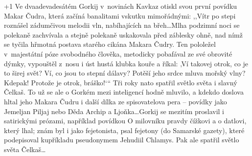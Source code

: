 \looseness+1
Ve dvaadevadesátém Gorkij v novinách Kavkaz otiskl svou první povídku Makar Čudra, která začíná banalitami vskutku mimořádnými: ,,Vítr po stepi roznášel zádumčivou melodii vln, nabíhajících na břeh\ldots Mlha podzimní noci se polekaně zachvívala a stejně polekaně uskakovala před záblesky ohně, nad nímž se tyčila hřmotná postava starého cikána Makara Čudry. Ten pololežel v majestátní póze svobodného člověka, metodicky pobafával ze své obrovité dýmky, vypouštěl z nosu i úst hustá klubka kouře a říkal: ‚Ví takovej otrok, co je to širej svět? Ví, co jsou to stepní dálavy? Potěší jeho srdce mluva mořský vlny? Kdepak! Protože je otrok, bráško!‘`` Tři roky nato spatřil světlo světa i slavný Čelkaš. To už se ale o Gorkém mezi inteligencí hodně mluvilo, a kdekdo doslova hltal jeho Makara Čudru i další dílka ze spisovatelova pera -- povídky jako Jemeljan Piljaj nebo Děda Archip a Ljoňka\ldots Gorkij se mezitím proslavil i satirickými prózami, například povídkou O milovníku pravdy čížkovi a o datlovi, který lhal; znám byl i jako fejetonista, psal fejetony (do Samarské gazety), které podepisoval kupříkladu pseudonymem Jehudiil Chlamys. Pak ale spatřil světlo světa Čelkaš\ldots

